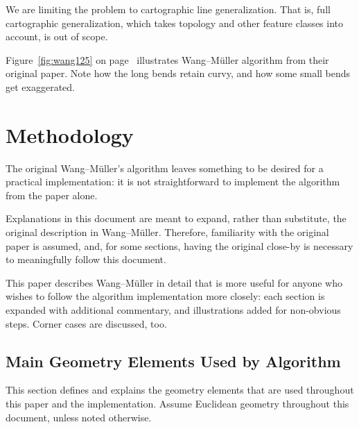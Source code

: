\documentclass[a4paper]{article}
\newcommand{\onpage}[1]{\ref{#1} on page~\pageref{#1}}
\newcommand{\WM}{Wang--M{\"u}ller}
\begin{document}
We are limiting the problem to cartographic line generalization. That is, full
cartographic generalization, which takes topology and other feature classes
into account, is out of scope.

Figure~\onpage{fig:wang125} illustrates {\WM} algorithm from their original
paper. Note how the long bends retain curvy, and how some small bends get
exaggerated.

\section{Methodology}
\label{sec:methodology}

The original {\WM}'s algorithm \cite{wang1998line} leaves something to be
desired for a practical implementation: it is not straightforward to implement
the algorithm from the paper alone.

Explanations in this document are meant to expand, rather than substitute, the
original description in {\WM}. Therefore, familiarity with the original paper is
assumed, and, for some sections, having the original close-by is necessary to
meaningfully follow this document.

This paper describes {\WM} in detail that is more useful for anyone who wishes
to follow the algorithm implementation more closely: each section is expanded
with additional commentary, and illustrations added for non-obvious steps. Corner
cases are discussed, too.

\subsection{Main Geometry Elements Used by Algorithm}
\label{sec:vocab}

This section defines and explains the geometry elements that are used
throughout this paper and the implementation. Assume Euclidean geometry
throughout this document, unless noted otherwise.
\end{document}
